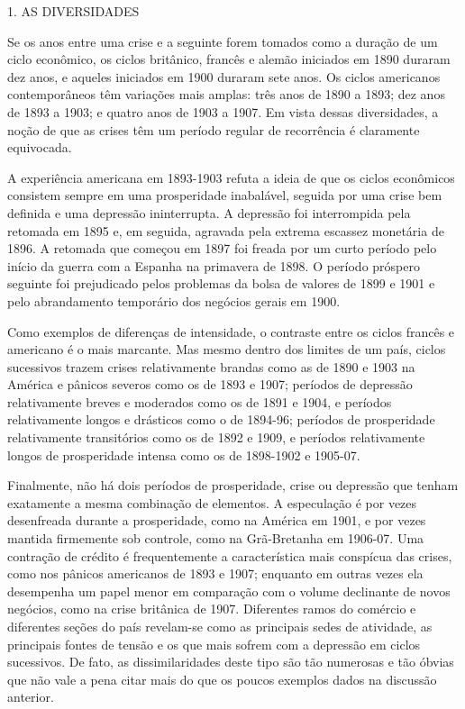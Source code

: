 \documentclass[12pt]{article}
\begin{document}
1. AS DIVERSIDADES

Se os anos entre uma crise e a seguinte forem tomados como a duração de um ciclo econômico, os ciclos britânico, francês e alemão iniciados em 1890 duraram dez anos, e aqueles iniciados em 1900 duraram sete anos. Os ciclos americanos contemporâneos têm variações mais amplas: três anos de 1890 a 1893; dez anos de 1893 a 1903; e quatro anos de 1903 a 1907. Em vista dessas diversidades, a noção de que as crises têm um período regular de recorrência é claramente equivocada.

A experiência americana em 1893-1903 refuta a ideia de que os ciclos econômicos consistem sempre em uma prosperidade inabalável, seguida por uma crise bem definida e uma depressão ininterrupta. A depressão foi interrompida pela retomada em 1895 e, em seguida, agravada pela extrema escassez monetária de 1896. A retomada que começou em 1897 foi freada por um curto período pelo início da guerra com a Espanha na primavera de 1898. O período próspero seguinte foi prejudicado pelos problemas da bolsa de valores de 1899 e 1901 e pelo abrandamento temporário dos negócios gerais em 1900.

Como exemplos de diferenças de intensidade, o contraste entre os ciclos francês e americano é o mais marcante. Mas mesmo dentro dos limites de um país, ciclos sucessivos trazem crises relativamente brandas como as de 1890 e 1903 na América e pânicos severos como os de 1893 e 1907; períodos de depressão relativamente breves e moderados como os de 1891 e 1904, e períodos relativamente longos e drásticos como o de 1894-96; períodos de prosperidade relativamente transitórios como os de 1892 e 1909, e períodos relativamente longos de prosperidade intensa como os de 1898-1902 e 1905-07.

Finalmente, não há dois períodos de prosperidade, crise ou depressão que tenham exatamente a mesma combinação de elementos. A especulação é por vezes desenfreada durante a prosperidade, como na América em 1901, e por vezes mantida firmemente sob controle, como na Grã-Bretanha em 1906-07. Uma contração de crédito é frequentemente a característica mais conspícua das crises, como nos pânicos americanos de 1893 e 1907; enquanto em outras vezes ela desempenha um papel menor em comparação com o volume declinante de novos negócios, como na crise britânica de 1907. Diferentes ramos do comércio e diferentes seções do país revelam-se como as principais sedes de atividade, as principais fontes de tensão e os que mais sofrem com a depressão em ciclos sucessivos. De fato, as dissimilaridades deste tipo são tão numerosas e tão óbvias que não vale a pena citar mais do que os poucos exemplos dados na discussão anterior.
\end{document}
